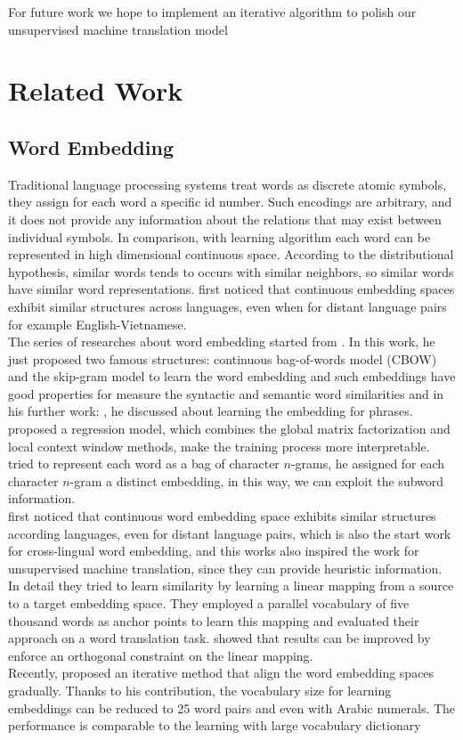 For future work we hope to implement an iterative algorithm to polish our unsupervised machine translation model 
\section{Related Work}

\subsection{Word Embedding}
\indent Traditional language processing systems treat words as discrete atomic symbols, they assign for each word a specific id number. Such encodings are arbitrary, and it does not provide any information about the relations that may exist between individual symbols. In comparison, with learning algorithm each word can be represented in high dimensional continuous space. According to the distributional hypothesis, similar words tends to occurs with similar neighbors, so similar words have similar word representations.  \cite{mikolov2013exploiting} first noticed that continuous embedding spaces exhibit similar structures across languages, even when for distant language pairs for example English-Vietnamese. \\
The series of researches about word embedding started from \cite{mikolov2013efficient}. In this work, he just proposed two famous structures: continuous bag-of-words model (CBOW) and the skip-gram model to learn the word embedding and such embeddings have good properties for measure the syntactic and semantic word similarities and in his further work: \cite{mikolov2013distributed}, he discussed about learning the embedding for phrases. \cite{pennington2014glove} proposed a regression model, which combines the global matrix factorization and local context window methods, make the training process more interpretable. \cite{bojanowski2016enriching} tried to represent each word as a bag of character $n$-grams, he assigned for each character $n$-gram a distinct embedding, in this way, we can exploit the subword information. \\
\cite{mikolov2013exploiting} first noticed that continuous word embedding space exhibits similar structures according languages, even for distant language pairs, which is also the start work for cross-lingual word embedding, and this works also inspired the work for unsupervised machine translation, since they can provide heuristic information. In detail they tried to learn similarity by learning a linear mapping from a source to a target embedding space. They employed a parallel vocabulary of five thousand words as anchor points to learn this mapping and evaluated their approach on a word translation task. \cite{xing2015normalized} showed that results can be improved by enforce an orthogonal constraint on the linear mapping.\\
Recently, \cite{artetxe2017learning} proposed an iterative method that align the word embedding spaces gradually. Thanks to his contribution, the vocabulary size for learning embeddings can be reduced to 25 word pairs and even with Arabic numerals. The performance is comparable to the learning with large vocabulary dictionary

